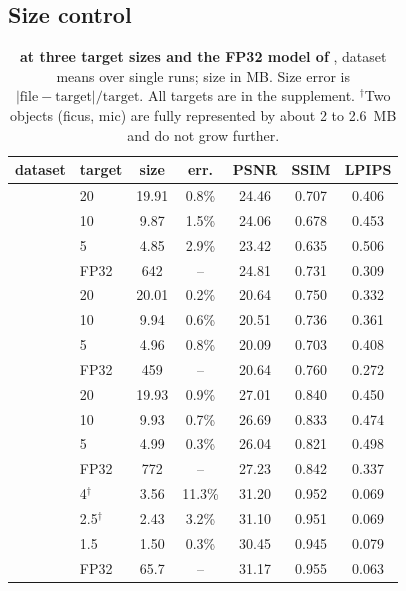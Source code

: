 \subsection{Size control}
\label{sec:control}

\begin{table}[t]\centering\footnotesize
\caption{\textbf{\BM at three target sizes and the FP32 model of \MS}, dataset means over single runs; size in MB. Size error is $|\text{file}-\text{target}|/\text{target}$. All targets are in the supplement. $^\dagger$Two objects (ficus, mic) are fully represented by about 2 to 2.6~MB and do not grow further.}
\label{tab:main}
\setlength{\tabcolsep}{3.2pt}
\begin{tabular}{@{}llccccc@{}}
\toprule
dataset & target & size & err. & PSNR & SSIM & LPIPS \\
\midrule
{} & 20 & 19.91 & 0.8\% & 24.46 & 0.707 & 0.406 \\
 & 10 & 9.87 & 1.5\% & 24.06 & 0.678 & 0.453 \\
 & 5 & 4.85 & 2.9\% & 23.42 & 0.635 & 0.506 \\
 & FP32 & 642 & -- & 24.81 & 0.731 & 0.309 \\
\midrule
{} & 20 & 20.01 & 0.2\% & 20.64 & 0.750 & 0.332 \\
 & 10 & 9.94 & 0.6\% & 20.51 & 0.736 & 0.361 \\
 & 5 & 4.96 & 0.8\% & 20.09 & 0.703 & 0.408 \\
 & FP32 & 459 & -- & 20.64 & 0.760 & 0.272 \\
\midrule
{} & 20 & 19.93 & 0.9\% & 27.01 & 0.840 & 0.450 \\
 & 10 & 9.93 & 0.7\% & 26.69 & 0.833 & 0.474 \\
 & 5 & 4.99 & 0.3\% & 26.04 & 0.821 & 0.498 \\
 & FP32 & 772 & -- & 27.23 & 0.842 & 0.337 \\
\midrule
{} & 4$^\dagger$ & 3.56 & 11.3\% & 31.20 & 0.952 & 0.069 \\
 & 2.5$^\dagger$ & 2.43 & 3.2\% & 31.10 & 0.951 & 0.069 \\
 & 1.5 & 1.50 & 0.3\% & 30.45 & 0.945 & 0.079 \\
 & FP32 & 65.7 & -- & 31.17 & 0.955 & 0.063 \\
\bottomrule
\end{tabular}
\end{table}

